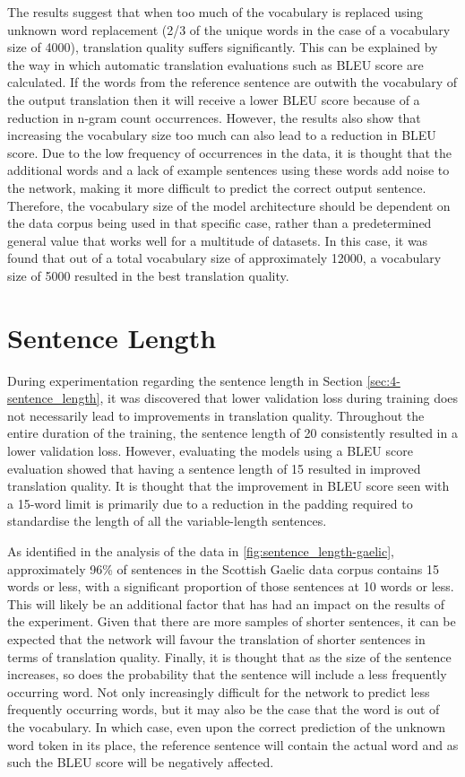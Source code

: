 The results suggest that when too much of the vocabulary is replaced using unknown word replacement (2/3 of the unique words in the case of a vocabulary size of 4000), translation quality suffers significantly. This can be explained by the way in which automatic translation evaluations such as \acrshort{BLEU} score are calculated. If the words from the reference sentence are outwith the vocabulary of the output translation then it will receive a lower \acrshort{BLEU} score because of a reduction in n-gram count occurrences. However, the results also show that increasing the vocabulary size too much can also lead to a reduction in \acrshort{BLEU} score. Due to the low frequency of occurrences in the data, it is thought that the additional words and a lack of example sentences using these words add noise to the network, making it more difficult to predict the correct output sentence. Therefore, the vocabulary size of the model architecture should be dependent on the data corpus being used in that specific case, rather than a predetermined general value that works well for a multitude of datasets. In this case, it was found that out of a total vocabulary size of approximately 12000, a vocabulary size of 5000 resulted in the best translation quality.

\section{Sentence Length}

During experimentation regarding the sentence length in Section \ref{sec:4-sentence_length}, it was discovered that lower validation loss during training does not necessarily lead to improvements in translation quality. Throughout the entire duration of the training, the sentence length of 20 consistently resulted in a lower validation loss. However, evaluating the models using a \acrshort{BLEU} score evaluation showed that having a sentence length of 15 resulted in improved translation quality. It is thought that the improvement in \acrshort{BLEU} score seen with a 15-word limit is primarily due to a reduction in the padding required to standardise the length of all the variable-length sentences.

As identified in the analysis of the data in \ref{fig:sentence_length-gaelic}, approximately 96\% of sentences in the Scottish Gaelic data corpus contains 15 words or less, with a significant proportion of those sentences at 10 words or less. This will likely be an additional factor that has had an impact on the results of the experiment. Given that there are more samples of shorter sentences, it can be expected that the network will favour the translation of shorter sentences in terms of translation quality. Finally, it is thought that as the size of the sentence increases, so does the probability that the sentence will include a less frequently occurring word. Not only increasingly difficult for the network to predict less frequently occurring words, but it may also be the case that the word is out of the vocabulary. In which case, even upon the correct prediction of the unknown word token in its place, the reference sentence will contain the actual word and as such the \acrshort{BLEU} score will be negatively affected.

